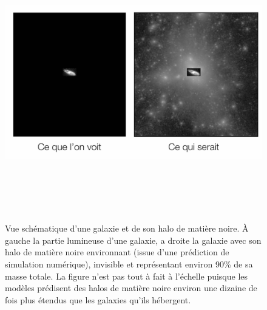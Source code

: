 \begin{figure}[htbp]
	\centering
		\includegraphics[height=12cm]{figs/halogal.png}
	\caption[Une galaxie et son halo de matière noire]{Vue schématique d'une galaxie et de son halo de matière noire. À gauche la partie lumineuse d'une galaxie, a droite la galaxie avec son halo de matière noire environnant (issue d'une prédiction de simulation numérique), invisible et représentant environ 90\% de sa masse totale. La figure n'est pas tout à fait à l'échelle puisque les modèles prédisent des halos de matière noire environ une dizaine de fois plus étendus que les galaxies qu'ils hébergent.} 
	\label{f:halogal}
\end{figure}


